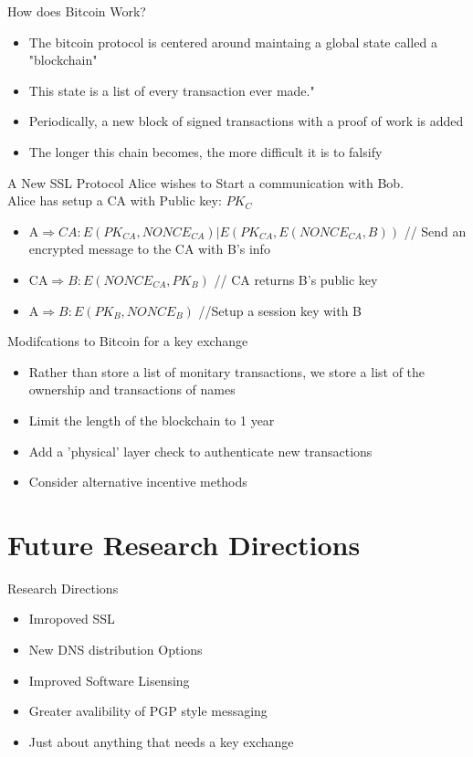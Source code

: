 \documentclass{beamer}
\begin{document}
\begin{frame}{How does Bitcoin Work?}
	\begin{itemize}
		\item{The bitcoin protocol is centered around maintaing a global state called a "blockchain"}
		\item{This state is a list of every transaction ever made."}
		\item{Periodically, a new block of signed transactions with a proof of work is added}
		\item{The longer this chain becomes, the more difficult it is to falsify}
	\end{itemize}


\end{frame}

\begin{frame}{A New SSL Protocol}
	Alice wishes to Start a communication with Bob.\\
	Alice has setup a CA with Public key: $PK_{C}$\\
	\begin{itemize}
		\item{ A$\Rightarrow{}CA: E(PK_{CA}, NONCE_{CA})|E(PK_{CA},E(NONCE_{CA},B))$ // Send an encrypted message to the CA with B's info}
		\item{ CA$\Rightarrow{}B: E( NONCE_{CA}, PK_{B})$ // CA returns B's public key} 
		\item{ A$\Rightarrow{}B: E(PK_{B}, NONCE_{B})$ //Setup a session key with B}
	\end{itemize}


\end{frame}

\begin{frame}{Modifcations to Bitcoin for a key exchange}
\begin{itemize}
	\item{Rather than store a list of monitary transactions, we store a list of the ownership and transactions of names}
	\item{Limit the length of the blockchain to 1 year}
	\item{Add a 'physical' layer check to authenticate new transactions}
	\item{Consider alternative incentive methods}
\end{itemize}
\end{frame}

\section{Future Research Directions}

\begin{frame}{Research Directions}
\begin{itemize}
	\item{Imropoved SSL}
	\item{New DNS distribution Options}
	\item{Improved Software Lisensing}
	\item{Greater avalibility of PGP style messaging}
	\item{Just about anything that needs a key exchange}
	
\end{itemize}


\end{frame}
\end{document}
